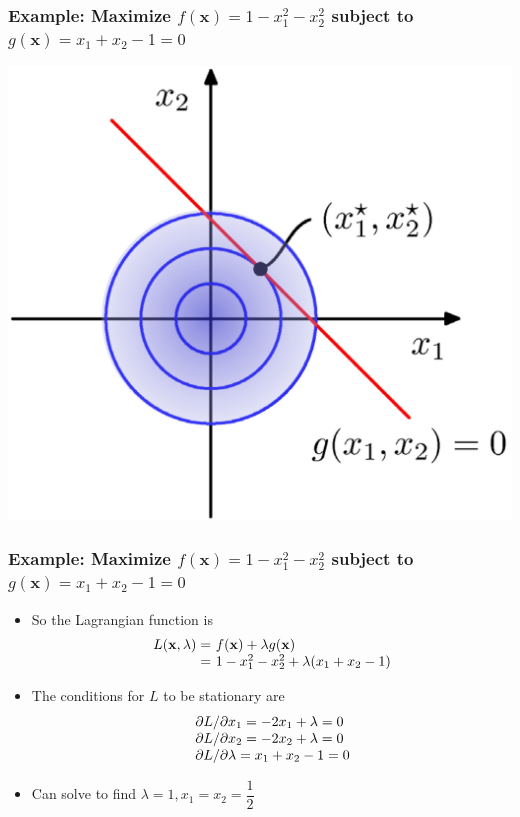 \documentclass[12pt,notes,mathserif]{beamer}
\begin{document}
\begin{frame}[c]
\frametitle{Example: Maximize $f(\mathbf{x})=1-x_1^2-x_2^2$ subject to $g(\mathbf{x})=x_1+x_2-1=0$}
\begin{center}
\includegraphics[width=0.65\linewidth]{fig8/lec830.jpg}
\end{center}
\end{frame}


\begin{frame}[c]
\frametitle{Example: Maximize $f(\mathbf{x})=1-x_1^2-x_2^2$ subject to $g(\mathbf{x})=x_1+x_2-1=0$}
\begin{itemize}
\item So the Lagrangian function is
\[
\begin{array}{r@{~}l}
L(\mathbf{x},\lambda)=&f(\mathbf{x})+\lambda g(\mathbf{x})\\
=&1-x_1^2-x_2^2+\lambda(x_1+x_2-1)
\end{array}
\]
\item The conditions for $L$ to be stationary are
\[
\begin{array}{l@{~}l}
\partial L/\partial x_1=-2x_1+\lambda=0\\
\partial L/\partial x_2=-2x_2+\lambda=0\\
\partial L/\partial \lambda=x_1+x_2-1=0\\
\end{array}
\]
\item Can solve to find $\lambda=1,x_1=x_2=\dfrac{1}{2}$
\end{itemize}
\end{frame}
\end{document}
